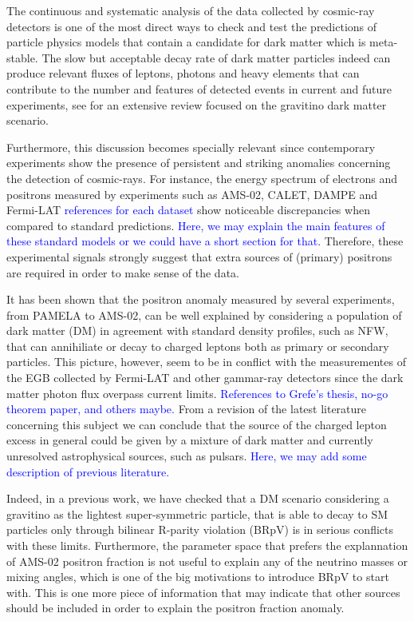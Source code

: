 \documentclass[a4paper,11pt]{article}
\newcommand*{\blue}{\textcolor{blue}}
\begin{document}
The continuous and systematic analysis of the data collected by cosmic-ray detectors is one of the most direct ways to check and test the predictions of particle physics models that contain a candidate for dark matter which is meta-stable. The slow but acceptable decay rate of dark matter particles indeed can produce relevant fluxes of leptons, photons and heavy elements that can contribute to the number and features of detected events in current and future experiments, see \cite{Grefe:2011dp} for an extensive review focused on the gravitino dark matter scenario. 

Furthermore, this discussion becomes specially relevant since contemporary experiments show the presence of persistent and striking anomalies concerning the detection of cosmic-rays. For instance, the energy spectrum of electrons and positrons measured by experiments such as AMS-02, CALET, DAMPE and Fermi-LAT \blue{references for each dataset} show noticeable discrepancies when compared to standard predictions. \blue{Here, we may explain the main features of these standard models or we could have a short section for that}. Therefore, these experimental signals strongly suggest that extra sources of (primary) positrons are required in order to make sense of the data. 

It has been shown that the positron anomaly measured by several experiments, from PAMELA to AMS-02, can be well explained by considering a population of dark matter (DM) in agreement with standard density profiles, such as NFW, that can annihiliate or decay to charged leptons
both as primary or secondary particles. This picture, however, seem to be in conflict with the measurementes of the EGB collected by Fermi-LAT
and other gammar-ray detectors since the dark matter photon flux overpass current limits. \blue{References to Grefe's thesis, no-go theorem paper, and others maybe.} From a revision of the latest literature concerning this subject we can conclude that the source of the charged lepton excess in general could be given by a mixture of dark matter and currently unresolved astrophysical sources, such as pulsars. \blue{Here, we may add some description of previous literature.}

Indeed, in a previous work, we have checked that a DM scenario considering a gravitino as the lightest super-symmetric particle, that is able to decay to SM particles only through bilinear R-parity violation (BRpV) is in serious conflicts with these limits. Furthermore, the parameter space that prefers the explannation of AMS-02 positron fraction is not useful to explain any of the neutrino masses or mixing angles, which is one of the big motivations to introduce BRpV to start with. This is one more piece of information that may indicate that other sources should be included in order to explain the positron fraction anomaly. 
\end{document}
